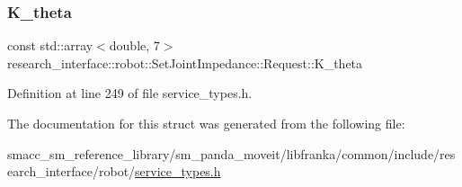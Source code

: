 \subsubsection{\texorpdfstring{K\+\_\+theta}{K\_theta}}
{\footnotesize\ttfamily const std\+::array$<$double, 7$>$ research\+\_\+interface\+::robot\+::\+Set\+Joint\+Impedance\+::\+Request\+::\+K\+\_\+theta}



Definition at line 249 of file service\+\_\+types.\+h.



The documentation for this struct was generated from the following file\+:\begin{DoxyCompactItemize}
\item 
smacc\+\_\+sm\+\_\+reference\+\_\+library/sm\+\_\+panda\+\_\+moveit/libfranka/common/include/research\+\_\+interface/robot/\hyperlink{service__types_8h}{service\+\_\+types.\+h}\end{DoxyCompactItemize}
